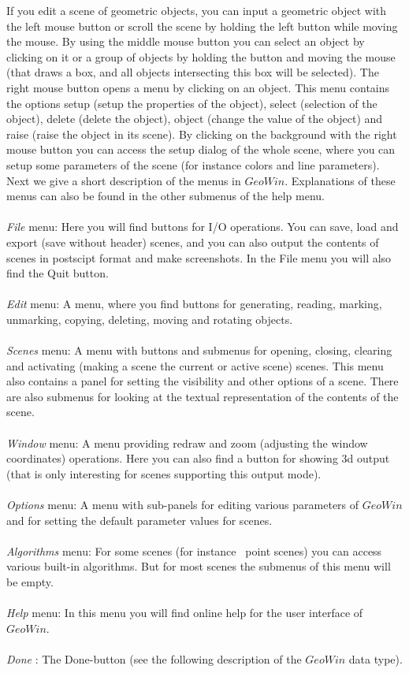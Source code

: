 If you edit a scene of geometric objects, you can 
input a geometric object with the left mouse button or scroll the scene by holding the
left button while moving the mouse. 
By using the middle mouse button you can select an object by
clicking on it or a group of objects by holding the button and moving the mouse (that draws a
box, and all objects intersecting this box will be selected). The right mouse button opens a
menu by clicking on an object. This menu contains the options setup (setup the properties of the
object), select (selection of the object), delete (delete the object), 
object (change the value of the object) and raise (raise the object in its scene). By clicking on
the background with the right mouse button you can access the setup dialog of the whole scene,
where you can setup some parameters of the scene (for instance colors and line parameters). \\
Next we give a short description of the menus in $GeoWin$. Explanations of these menus can also be
found in the other submenus of the help menu.
\\
\\
{\em File} menu:
Here you will find buttons for I/O operations. You can save, load and export (save without header) scenes,
and you can also output the contents of scenes in postscipt format and make screenshots.
In the File menu you will also find the Quit button.
\\
\\
{\em Edit} menu:
A menu, where you find buttons for generating, reading, marking, unmarking, copying, deleting, moving
and rotating objects.
\\
\\
{\em Scenes} menu:
A menu with buttons and submenus for opening, closing, clearing and activating (making a scene the current or
active scene) scenes. This menu also contains a panel for setting the visibility and other options of a scene.
There are also submenus for looking at the textual representation of the contents of the scene.
\\
\\
{\em Window} menu:
A menu providing redraw and zoom (adjusting the window coordinates) operations. Here you can also find a button for
showing 3d output (that is only interesting for scenes supporting this output mode).
\\
\\
{\em Options} menu:
A menu with sub-panels for editing various parameters of $GeoWin$ and for setting the default parameter values for scenes.
\\
\\
{\em Algorithms} menu:
For some scenes (for instance \leda\ point scenes) you can access various built-in algorithms. But for most scenes
the submenus of this menu will be empty.
\\
\\
{\em Help} menu:
In this menu you will find online help for the user interface of $GeoWin$.
\\
\\
{\em Done} :
The Done-button (see the following description of the $GeoWin$ data type).

